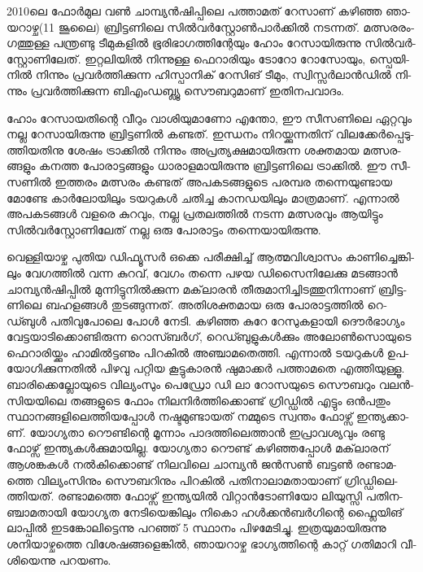 \vskip 2pt

2010­ലെ ­ഫോര്‍­മുല വണ്‍ ചാ­മ്പ്യന്‍­ഷി­പ്പി­ലെ പത്താ­മ­ത് റേ­സാ­ണ് കഴി­ഞ്ഞ ഞാ­യ­റാ­ഴ്ച(11 ജൂ­ലൈ) ബ്രി­ട്ട­ണി­ലെ സില്‍­വര്‍­സ്റ്റോണ്‍­പാര്‍­ക്കില്‍ 
നട­ന്ന­ത്. മത്സ­ര­രം­ഗ­ത്തു­ള്ള പന്ത്ര­ണ്ടു ടീ­മു­ക­ളില്‍ ഭൂ­രി­ഭാ­ഗ­ത്തി­ന്റേ­യും ഹോം റേ­സാ­യി­രു­ന്നു സില്‍­വര്‍­സ്റ്റോ­ണി­ലേ­ത്. ഇറ്റ­ലി­യില്‍ 
നി­ന്നു­ള്ള ഫെ­റാ­രി­യും ടോ­റോ റോ­സോ­യും, സ്പെ­യി­നില്‍ നി­ന്നും പ്ര­വര്‍­ത്തി­ക്കു­ന്ന ഹി­സ്പാ­നി­ക് റേ­സി­ങ് ടീ­മും, സ്വി­സ്സര്‍­ലാന്‍­ഡില്‍ 
നി­ന്നും പ്ര­വര്‍­ത്തി­ക്കു­ന്ന ­ബി­എം­ഡ­ബ്ല്യൂ­ സൌ­ബ­റു­മാ­ണ് ഇതി­ന­പ­വാ­ദം.

­ഹോം റേ­സാ­യ­തി­ന്റെ വീ­റും വാ­ശി­യു­മാ­ണോ എന്തോ, ഈ സീ­സ­ണി­ലെ ഏറ്റ­വും നല്ല റേ­സാ­യി­രു­ന്നു ബ്രി­ട്ട­ണില്‍ കണ്ട­ത്.  
ഇന്ധ­നം നി­റ­യ്ക്കു­ന്ന­തി­ന് വി­ല­ക്കേര്‍­പ്പെ­ടു­ത്തി­യ­തി­നു ശേ­ഷം ട്രാ­ക്കില്‍ നി­ന്നും അപ്ര­ത്യ­ക്ഷ­മാ­യി­രു­ന്ന ശക്ത­മായ മത്സ­ര­ങ്ങ­ളും കന­ത്ത
 പോ­രാ­ട്ട­ങ്ങ­ളും ധാ­രാ­ള­മാ­യി­രു­ന്നു ബ്രി­ട്ട­ണി­ലെ ട്രാ­ക്കില്‍. ഈ സീ­സ­ണില്‍ ഇത്ത­രം മത്സ­രം കണ്ട­ത് അപ­ക­ട­ങ്ങ­ളു­ടെ പര­മ്പര 
 തന്നെ­യു­ണ്ടായ മോ­ണ്ടേ കാര്‍­ലോ­യി­ലും ടയ­റു­കള്‍ ചതി­ച്ച കാ­ന­ഡ­യി­ലും മാ­ത്ര­മാ­ണ്. എന്നാല്‍ അപ­ക­ട­ങ്ങള്‍ വള­രെ കു­റ­വും, 
 നല്ല പ്ര­ത­ല­ത്തില്‍ നട­ന്ന മത്സ­ര­വും ആയി­ട്ടും സില്‍­വര്‍­സ്റ്റോ­ണി­ലേ­ത് നല്ല ഒരു പോ­രാ­ട്ടം തന്നെ­യാ­യി­രു­ന്നു­.

­വെ­ള്ളി­യാ­ഴ്ച പു­തിയ ഡി­ഫ്യൂ­സര്‍ ഒക്കെ പരീ­ക്ഷി­ച്ച് ആത്മ­വി­ശ്വാ­സം കാ­ണി­ച്ചെ­ങ്കി­ലും വേ­ഗ­ത്തില്‍ വന്ന കു­റ­വ്, വേ­ഗം തന്നെ പഴയ 
ഡി­സൈ­നി­ലേ­ക്കു മട­ങ്ങാന്‍ ചാ­മ്പ്യന്‍­ഷി­പ്പില്‍ മു­ന്നി­ട്ടു­നില്‍­ക്കു­ന്ന മക്‌­ലാ­രന്‍ തീ­രു­മാ­നി­ച്ചി­ട­ത്തു­നി­ന്നാ­ണ് ബ്രി­ട്ട­ണി­ലെ ബഹ­ള­ങ്ങള്‍ 
തു­ട­ങ്ങു­ന്ന­ത്. അതി­ശ­ക്ത­മായ ഒരു പോ­രാ­ട്ട­ത്തില്‍ ­റെ­ഡ്ബുള്‍ പതി­വു­പോ­ലെ പോള്‍ നേ­ടി. കഴി­ഞ്ഞ കു­റേ റേ­സു­ക­ളാ­യി ദൌര്‍­ഭാ­ഗ്യം 
വേ­ട്ട­യാ­ടി­ക്കൊ­ണ്ടി­രു­ന്ന റൊ­സ്ബര്‍­ഗ്, റെ­ഡ്ബു­ളു­കള്‍­ക്കും അലോണ്‍­സൊ­യു­ടെ ഫെ­റാ­രി­യ്ക്കും ഹാ­മില്‍­ട്ട­ണും പി­റ­കില്‍ അഞ്ചാ­മ­തെ­ത്തി. 
എന്നാല്‍ ടയ­റു­കള്‍ ഉപ­യോ­ഗി­ക്കു­ന്ന­തില്‍ പി­ഴ­വു പറ്റിയ കൂ­ട്ടു­കാ­രന്‍ ഷു­മാ­ക്കര്‍ പത്താ­മ­തെ എത്തി­യു­ള്ളൂ. ബാ­രി­ക്കെ­ല്ലോ­യു­ടെ വി­ല്യം­സും 
പെ­ഡ്രോ ഡി ലാ റോ­സ­യു­ടെ സൌ­ബ­റും വലന്‍­സി­യ­യി­ലെ തങ്ങ­ളു­ടെ ഫോം നി­ല­നിര്‍­ത്തി­ക്കൊ­ണ്ട് ഗ്രി­ഡ്ഡില്‍ എട്ടും ഒന്‍­പ­തും 
സ്ഥാ­ന­ങ്ങ­ളി­ലെ­ത്തി­യ­പ്പോള്‍ നഷ്ട­മു­ണ്ടാ­യ­ത് നമ്മു­ടെ സ്വ­ന്തം ഫോ­ഴ്സ് ഇന്ത്യ­ക്കാ­ണ്. യോ­ഗ്യ­താ റൌ­ണ്ടി­ന്റെ മൂ­ന്നാം പാ­ദ­ത്തി­ലെ­ത്താന്‍ 
ഇപ്രാ­വ­ശ്യ­വും രണ്ടു ഫോ­ഴ്സ് ഇന്ത്യ­കള്‍­ക്കു­മാ­യി­ല്ല. യോ­ഗ്യ­താ റൌ­ണ്ട് കഴി­ഞ്ഞ­പ്പോള്‍ മക്‌­ലാ­ര­ന് ആശ­ങ്ക­കള്‍ നല്‍­കി­ക്കൊ­ണ്ട് നി­ല­വി­ലെ 
ചാ­മ്പ്യന്‍ ­ജന്‍­സണ്‍ ബട്ടണ്‍ രണ്ടാ­മ­ത്തെ വി­ല്യം­സി­നും സൌ­ബ­റി­നും പി­റ­കില്‍ പതി­നാ­ലാ­മ­താ­യാ­ണ് ഗ്രി­ഡ്ഡി­ലെ­ത്തി­യ­ത്. രണ്ടാ­മ­ത്തെ 
ഫോ­ഴ്സ് ഇന്ത്യ­യില്‍ ­വി­റ്റാന്‍­ടോ­ണി­യോ ലി­യു­സ്സി­ പതി­ന­ഞ്ചാ­മ­താ­യി യോ­ഗ്യത നേ­ടി­യെ­ങ്കി­ലും നി­കൊ ഹള്‍­ക്കന്‍­ബര്‍­ഗി­ന്റെ ഫ്ലൈ­യി­ങ് 
ലാ­പ്പില്‍ ഇട­ങ്കോ­ലി­ട്ടെ­ന്നു പറ­ഞ്ഞ് 5 സ്ഥാ­നം പി­ഴ­മേ­ടി­ച്ചു. ഇത്ര­യു­മാ­യി­രു­ന്നു ശനി­യാ­ഴ്ച­ത്തെ വി­ശേ­ഷ­ങ്ങ­ളെ­ങ്കില്‍, ഞാ­യ­റാ­ഴ്ച ഭാ­ഗ്യ­ത്തി­ന്റെ 
കാ­റ്റ് ഗതി­മാ­റി വീ­ശി­യെ­ന്നു പറ­യ­ണം­.

